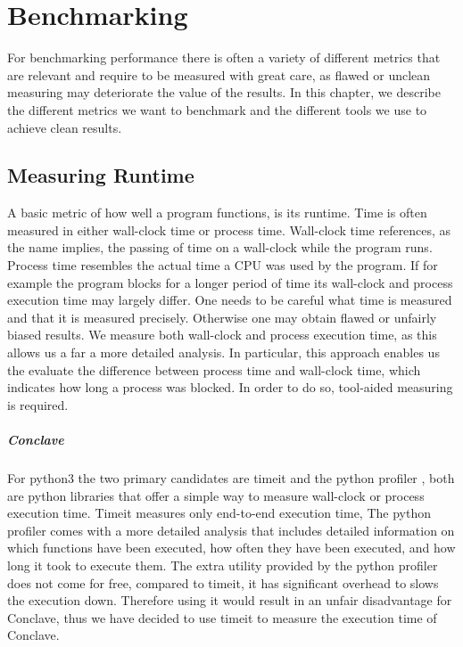 \chapter{Benchmarking}
For benchmarking performance there is often a variety of different metrics that are relevant and require to be measured with great care, as flawed or unclean measuring may deteriorate the value of the results. In this chapter, we describe the different metrics we want to benchmark and the different tools we use to achieve clean results. 

\section{Measuring Runtime}
A basic metric of how well a program functions, is its runtime. Time is often measured in either wall-clock time or process time. Wall-clock time references, as the name implies, the passing of time on a wall-clock while the program runs. 
Process time resembles the actual time a CPU was used by the program. If for example the program blocks for a longer period of time its wall-clock and process execution time may largely differ.    One needs to be careful what time is measured and that it is measured precisely. Otherwise one may obtain flawed or unfairly biased results. We measure both wall-clock and process execution time, as this allows us a far a more detailed analysis. In particular, this approach enables us the evaluate the difference between process time and wall-clock time, which indicates how long a process was blocked. In order to do so, tool-aided measuring is required.

\paragraph{Conclave}
 For python3 the two primary candidates are timeit \cite{time} and the python profiler \cite{cProfile},
 both are python libraries that offer a simple way to measure wall-clock or process execution time. Timeit measures only end-to-end execution time,    The python profiler comes with a more detailed analysis that includes detailed information on which functions have been executed, how often they have been executed, and how long it took to execute them. The extra utility provided by the python profiler does not come for free, compared to timeit, it has significant overhead to slows the execution down. Therefore using it would result in an unfair disadvantage for Conclave, thus we have decided to use timeit to measure the execution time of Conclave. 
